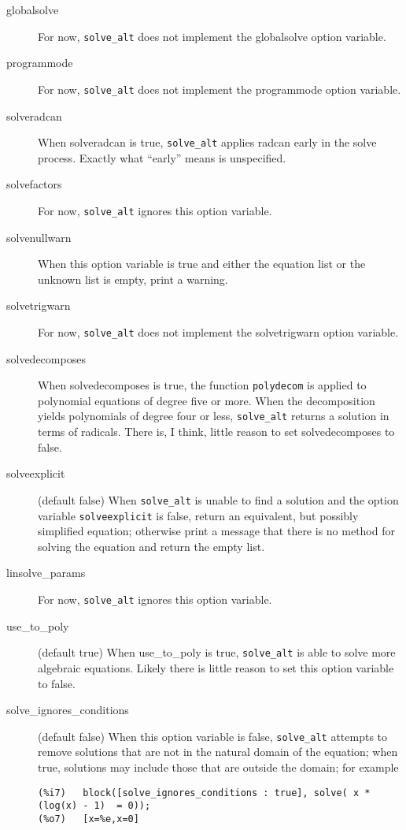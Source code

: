 \documentclass[]{scrartcl}
\newcommand{\altsolve}{\texttt{solve\_alt}}
\newcommand{\solveexplicit}{\texttt{solveexplicit}}
\begin{document}
\begin{description}

\item [globalsolve] For now, \altsolve\/ does not implement the globalsolve option variable.

\item [programmode] For now, \altsolve\/ does not implement the programmode option variable.

\item [solveradcan] When solveradcan is true, \altsolve\/ applies radcan early in the solve process.
      Exactly what ``early'' means is unspecified.

\item [solvefactors] For now, \altsolve\/ ignores this option variable.

\item [solvenullwarn] When this option variable is true and either the equation list or the unknown list is
empty, print a warning.

\item [solvetrigwarn] For now, \altsolve\/ does not implement the solvetrigwarn option variable.

\item [solvedecomposes] When solvedecomposes is true, the function \texttt{polydecom} is applied to
polynomial equations of degree five or more. When the decomposition yields polynomials of degree four
or less, \altsolve\/ returns a solution in terms of radicals. There is, I think, little reason to
set solvedecomposes to false.

\item [solveexplicit] (default false) When \altsolve\/  is unable to find a solution and the option variable \solveexplicit\/ is false, return an equivalent, but possibly simplified equation;  otherwise print a message that there is no method for solving the equation and return the empty list.

\item [linsolve\_params] For now, \altsolve \/ ignores this option variable.

\item [use\_to\_poly] (default true)  When use\_to\_poly is true, \altsolve\/ is able to solve more algebraic
equations.  Likely there is little reason to set this option variable to false.

\item[solve\_ignores\_conditions] (default false) When this option variable is false, \altsolve\/ attempts to
remove solutions that are not in the natural domain of the equation; when true, solutions may include those that are outside the domain; for example
\begin{verbatim}
(%i7)	block([solve_ignores_conditions : true], solve( x * (log(x) - 1)  = 0));
(%o7)	[x=%e,x=0]


\end{verbatim}
\end{description}
\end{document}
